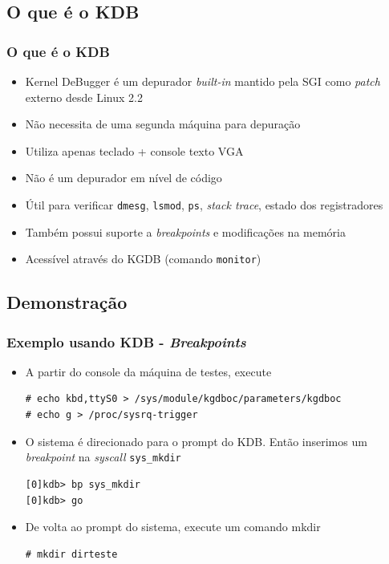\documentclass[xcolor=pdftex,dvipsnames,table]{beamer}
\begin{document}
\subsection{O que é o KDB}
\begin{frame}
       \frametitle{O que é o KDB}
        \begin{center}
        \begin{itemize}
	    \item Kernel DeBugger é um depurador \textit{built-in} mantido pela SGI como \textit{patch} externo desde Linux 2.2
	    \item Não necessita de uma segunda máquina para depuração
	    \item Utiliza apenas teclado + console texto VGA
	    \item Não é um depurador em nível de código
	    \item Útil para verificar {\tt dmesg}, {\tt lsmod}, {\tt ps}, \textit{stack trace}, estado dos registradores
	    \item Também possui suporte a \textit{breakpoints} e modificações na memória
	    \item Acessível através do KGDB (comando {\tt monitor})
	\end{itemize}
        \end{center}
\end{frame}

\subsection{Demonstração}
\begin{frame}[fragile]
       \frametitle{Exemplo usando KDB - \textit{Breakpoints}}
        \begin{center}
	\begin{itemize}
		\item A partir do console da máquina de testes, execute
		\tiny
		\begin{verbatim}
# echo kbd,ttyS0 > /sys/module/kgdboc/parameters/kgdboc
# echo g > /proc/sysrq-trigger
		\end{verbatim}
		\normalsize
		\item O sistema é direcionado para o prompt do KDB. Então inserimos um \textit{breakpoint} na \textit{syscall} {\tt sys\_mkdir}
		\tiny
		\begin{verbatim}
[0]kdb> bp sys_mkdir
[0]kdb> go
		\end{verbatim}
		\normalsize
		\item De volta ao prompt do sistema, execute um comando mkdir
		\tiny
		\begin{verbatim}
# mkdir dirteste
		\end{verbatim}
		\normalsize
	\end{itemize}
        \end{center}
\end{frame}
\end{document}
